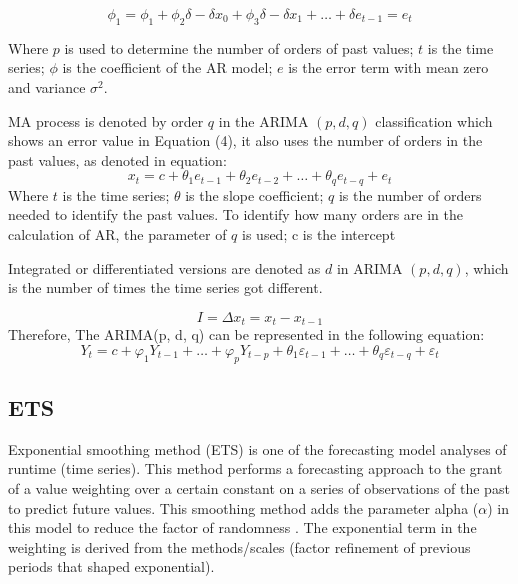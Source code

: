 \documentclass[conference]{IEEEtran}
\begin{document}
\begin{equation}
\phi_1 = \phi_1 + \phi_2 \delta - \delta x_0 + \phi_3 \delta - \delta x_1 + \ldots + \delta e_{t-1} = e_t
\end{equation}

Where $p$ is used to determine the number of orders of past values; $t$ is the time series; $\phi$ is the coefficient of the AR model; $e$ is the error term with mean zero and variance $\sigma^2$.

MA process is denoted by order $q$ in the ARIMA $(p, d, q)$ classification which shows an error value in Equation (4), it also uses the number of orders in the past values, as denoted in equation:
\begin{equation}
x_t = c +\theta_1 e_{t-1} + \theta_2 e_{t-2} + \ldots + \theta_q e_{t-q} + e_t
\end{equation}
Where $t$ is the time series; $\theta$ is the slope coefficient; $q$ is the number of orders needed to identify the past values. To identify how many orders are in the calculation of AR, the parameter of $q$ is used; c is the intercept

Integrated or differentiated versions are denoted as $d$ in ARIMA $(p, d, q)$, which is the number of times the time series got different.

\begin{equation}
I = \Delta x_t = x_t - x_{t-1}
\end{equation}
Therefore, The ARIMA(p, d, q) can be represented in the following equation:
\begin{equation}
    Y_t = c + \varphi_1 Y_{t-1} + \ldots + \varphi_p Y_{t-p} + \theta_1 \varepsilon_{t-1} + \ldots + \theta_q \varepsilon_{t-q} + \varepsilon_t
\end{equation}

\subsection{ETS}
Exponential smoothing method (ETS) is one of the forecasting model analyses of runtime (time series). This method performs a forecasting approach to the grant of a value weighting over a certain constant on a series of observations of the past to predict future values. This smoothing method adds the parameter alpha (\(\alpha\)) in this model to reduce the factor of randomness \cite{b11}. The exponential term in the weighting is derived from the methods/scales (factor refinement of previous periods that shaped exponential).
\end{document}
